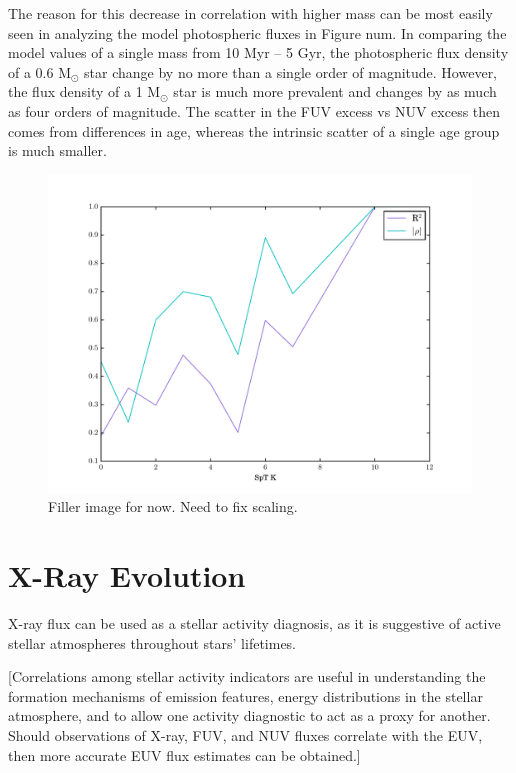\documentclass[twocolumn]{aastex62}
\begin{document}
The reason for this decrease in correlation with higher mass can be most easily seen in analyzing the model photospheric fluxes in Figure num. In comparing the model values of a single mass from 10 Myr -- 5 Gyr, the photospheric flux density of a 0.6 M$_{\odot}$ star change by no more than a single order of magnitude. However, the flux density of a 1 M$_{\odot}$ star is much more prevalent and changes by as much as four orders of magnitude. The scatter in the FUV excess vs NUV excess then comes from differences in age, whereas the intrinsic scatter of a single age group is much smaller. 


\begin{figure}[t]
\centering
\includegraphics[width=\linewidth]{R2_vs_spt.pdf}
\caption{Filler image for now. Need to fix scaling. \label{fig:r2_vs_spt}}
\end{figure}

\section{X-Ray Evolution}

X-ray flux can be used as a stellar activity diagnosis, as it is suggestive of active stellar atmospheres throughout stars’ lifetimes. 

[Correlations among stellar activity indicators are useful in understanding the formation mechanisms of emission features, energy distributions in the stellar atmosphere, and to allow one activity diagnostic to act as a proxy for another. Should observations of X-ray, FUV, and NUV fluxes correlate with the EUV, then more accurate EUV flux estimates can be obtained.]
\end{document}
